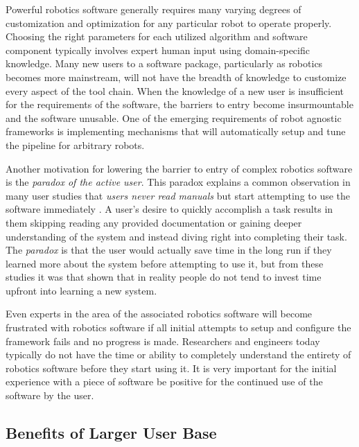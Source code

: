 \documentclass[10pt,journal,compsoc]{joser1}
\begin{document}
{Powerful robotics software generally requires many varying degrees of customization and optimization for any particular robot to operate properly. Choosing the right parameters for each utilized algorithm and software component typically involves expert human input using domain-specific knowledge. Many new users to a software package, particularly as robotics becomes more mainstream, will not have the breadth of knowledge to customize every aspect of the tool chain. When the knowledge of a new user is insufficient for the requirements of the software, the barriers to entry become insurmountable and the software unusable. One of the emerging requirements of robot agnostic frameworks is implementing mechanisms that will automatically setup and tune the pipeline for arbitrary robots.

Another motivation for lowering the barrier to entry of complex robotics software is the \textit{paradox of the active user}. This paradox explains a common observation in many user studies that \textit{users never read manuals} but start attempting to use the software immediately \cite{carroll1987interfacing}. A user's desire to quickly accomplish a task results in them skipping reading any provided documentation or gaining deeper understanding of the system and instead diving right into completing their task. The \textit{paradox} is that the user would actually save time in the long run if they learned more about the system before attempting to use it, but from these studies it was that shown that in reality people do not tend to invest time upfront into learning a new system.

Even experts in the area of the associated robotics software will become frustrated with robotics software if all initial attempts to setup and configure the framework fails and no progress is made. Researchers and engineers today typically do not have the time or ability to completely understand the entirety of robotics software before they start using it. It is very important for the initial experience with a piece of software be positive for the continued use of the software by the user.

\subsection{Benefits of Larger User Base}

}
\end{document}
